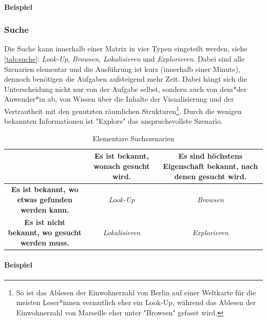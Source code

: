 			\paragraph{Beispiel}

			\subsubsection{Suche}
				Die Suche kann innerhalb einer Matrix in vier Typen eingeteilt werden, siehe \autoref{tab:suche}: \emph{Look-Up}, \emph{Browsen}, \emph{Lokalisieren} und \emph{Explorieren}. Dabei sind alle Szenarien elementar und die Ausführung ist kurz (innerhalb einer Minute), dennoch benötigen die Aufgaben aufsteigend mehr Zeit. Dabei hängt sich die Unterscheidung nicht nur von der Aufgabe selbst, sondern auch von dem*der Anwender*in ab, \dh von Wissen über die Inhalte der Visualisierung und der Vertrautheit mit den genutzten räumlichen Strukturen\footnote{So ist das Ablesen der Einwohnerzahl von Berlin auf einer Weltkarte für die meisten Leser*innen vermutlich eher ein Look-Up, während das Ablesen der Einwohnerzahl von Marseille eher unter "Browsen" gefasst wird.}. Durch die wenigen bekannten Informationen ist "Explore" das anspruchsvollste Szenario.

				\begin{table}
					\centering
					\begin{tabular}{c|cc}
						\toprule
						                                                        & \textbf{Es ist bekannt, wonach gesucht wird.} & \textbf{Es sind höchstens Eigenschaft bekannt, nach denen gesucht wird.} \\ \midrule
						\textbf{Es ist bekannt, wo etwas gefunden werden kann.} &                \emph{Look-Up}                 &                              \emph{Browsen}                              \\
						\textbf{Es ist nicht bekannt, wo gesucht werden muss.}  &              \emph{Lokalisieren}              &                            \emph{Explorieren}                            \\ \bottomrule
					\end{tabular}
					\caption{Elementare Suchszenarien}
					\label{tab:suche}
				\end{table}

				\paragraph{Beispiel}

